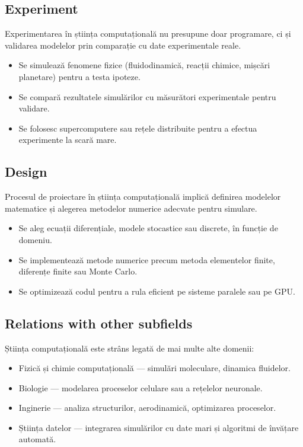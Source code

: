 \documentclass[12pt, letterpaper]{article}
\begin{document}
\subsection*{Experiment}
Experimentarea în știința computațională nu presupune doar programare, ci și validarea modelelor prin comparație cu date experimentale reale.
\begin{itemize}
    \item Se simulează fenomene fizice (fluidodinamică, reacții chimice, mișcări planetare) pentru a testa ipoteze.
    \item Se compară rezultatele simulărilor cu măsurători experimentale pentru validare.
    \item Se folosesc supercomputere sau rețele distribuite pentru a efectua experimente la scară mare.
\end{itemize}

\subsection*{Design}
Procesul de proiectare în știința computațională implică definirea modelelor matematice și alegerea metodelor numerice adecvate pentru simulare.
\begin{itemize}
    \item Se aleg ecuații diferențiale, modele stocastice sau discrete, în funcție de domeniu.
    \item Se implementează metode numerice precum metoda elementelor finite, diferențe finite sau Monte Carlo.
    \item Se optimizează codul pentru a rula eficient pe sisteme paralele sau pe GPU.
\end{itemize}

\subsection*{Relations with other subfields}
Știința computațională este strâns legată de mai multe alte domenii:
\begin{itemize}
    \item Fizică și chimie computațională — simulări moleculare, dinamica fluidelor.
    \item Biologie — modelarea proceselor celulare sau a rețelelor neuronale.
    \item Inginerie — analiza structurilor, aerodinamică, optimizarea proceselor.
    \item Știința datelor — integrarea simulărilor cu date mari și algoritmi de învățare automată.
\end{itemize}
\end{document}
